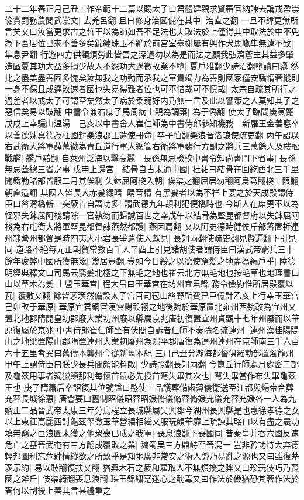 二十二年春正月己丑上作帝範十二篇以賜太子曰君體建親求賢審官納諫去讒戒盈崇儉賞罰務農閲武崇文|{
	去羌呂翻}
且曰修身治國備在其中|{
	治直之翻}
一旦不諱更無所言矣又曰汝當更求古之哲王以為師如吾不足法也夫取法於上僅得其中取法於中不免為下吾居位已來不善多矣錦繡珠玉不絶於前宫室臺榭屢有興作犬馬鷹隼無遠不致|{
	隼息尹翻}
行遊四方供頓煩勞此皆吾之深過勿以為是而法之顧我弘濟蒼生其益多肇造區夏其功大益多損少故人不怨功大過微故業不墮|{
	夏戶雅翻少詩沼翻墮讀曰隳}
然比之盡美盡善固多愧矣汝無我之功勤而承我之富貴竭力為善則國家僅安驕惰奢縱則一身不保且成遲敗速者國也失易得難者位也可不惜哉可不慎哉|{
	太宗自疏其所行之過差者以戒太子可謂至矣然太子病於柔弱好内乃無一言及此以警策之人莫知其子之惡信矣易以豉翻}
中書令兼右庶子馬周病上親為調藥|{
	為于偽翻}
使太子臨問庚寅薨戊戍上幸驪山温湯　己亥以中書舍人崔仁師為中書侍郎參知機務　新羅王金善悳卒以善德妹真德為柱國封樂浪郡王遣使冊命|{
	卒子恤翻樂浪音洛琅使疏吏翻}
丙午詔以右武衛大將軍薛萬徹為青丘道行軍大總管右衛將軍裴行方副之將兵三萬餘人及樓舩戰艦|{
	艦戶黯翻}
自萊州泛海以擊高麗　長孫無忌檢校中書令知尚書門下省事|{
	長孫無忌蓋總三省之事}
戊申上還宫　結骨自古未通中國|{
	杜祐曰結骨在回紇西北三千里}
聞鐵勒諸部皆服二月其俟利失鉢屈阿棧入朝|{
	俟渠之翻屈居勿翻阿烏葛翻棧士限翻朝直遥翻}
其國人皆長大赤髪緑睛|{
	睛音精}
有黑髪者以為不祥上宴之於天成殿謂侍臣曰㫺渭橋斬三突厥首自謂功多|{
	謂武德九年頡利犯便橋時也}
今斯人在席更不以為怪邪失鉢屈阿棧請除一官執笏而歸誠百世之幸戊午以結骨為堅昆都督府以失鉢屈阿棧為右屯衛大將軍堅昆都督隸燕然都護|{
	燕因肩翻}
又以阿史德時健俟斤部落置祈連州隸營州都督是時四夷大小君長爭遣使入獻見|{
	長知兩翻使疏吏翻見賢遍翻下引見同}
道路不絶每元正朝賀常數百千人辛酉上引見諸胡使者謂侍臣曰漢武帝窮兵三十餘年疲弊中國所獲無幾|{
	幾居豈翻}
豈如今日綏之以德使窮髪之地盡為編戶乎|{
	陸德明經典釋文曰司馬云窮髪北極之下無毛之地也崔云北方無毛地也按毛草也地理書曰山以草木為髪}
上營玉華宫|{
	程大昌曰玉華宫在坊州宜君縣}
務令儉約惟所居殿覆以瓦|{
	覆敷又翻}
餘皆茅茨然備設太子宫百司苞山絡野所費已巨億計乙亥上行幸玉華宫己卯畋于華原|{
	華原宜君銅官漢雲陽祋祤之地後魏於華原置北雍州西魏改為宜州又置北地郡隋開皇初郡廢大業初州廢以縣屬京兆唐初復置宜州貞觀十七年州廢而以華原復屬於京兆}
中書侍郎崔仁師坐有伏閤自訴者仁師不奏除名流連州|{
	連州漢桂陽陽山之地梁置陽山郡隋置連州大業初廢州為熙平郡唐復為連州連州在京師南三千六百六十五里考異曰舊傳本龔州今從新舊本紀}
三月己丑分瀚海都督俱羅勃部置燭龍州　甲午上謂侍臣曰朕少長兵間頗能料敵|{
	少詩照翻長知兩翻}
今崑丘行師處月處密二部及龜茲用事者羯獵顛那利每懷首鼠必先授首弩失畢其次也|{
	弩失畢當作布失畢龜茲王也}
庚子隋蕭后卒詔復其位號諡曰愍使三品護葬備鹵薄儀衛送至江都與煬帝合葬　充容長城徐惠|{
	唐會要曰舊制昭儀昭容昭媛脩儀脩容脩媛充儀充容充媛各一人為九嬪正二品晉武帝太康三年分烏程立長城縣屬吴興郡今湖州長興縣是也惠徐孝德之女}
以上東征高麗西討龜茲翠微玉華營繕相繼又服玩頗華靡上疏諫其略曰以有盡之農功填無窮之巨浪圖未獲之他衆喪已成之我軍|{
	喪息浪翻下喪國同}
昔秦皇并吞六國反速危亡之基晉武奄有三方翻成覆敗之業|{
	魏蜀吴三方鼎峙至晉混一}
豈非矜功恃大弃德輕邦圖利忘危肆情縱欲之所致乎是知地廣非常安之術人勞乃易亂之源也又曰雖復茅茨示約|{
	易以豉翻復扶又翻}
猶興木石之疲和雇取人不無煩擾之弊又曰珍玩伎巧乃喪國之斧斤|{
	伎渠綺翻喪息浪翻}
珠玉錦繡寔迷心之酖毒又曰作法於儉猶恐其奢作法於奢何以制後上善其言甚禮重之


